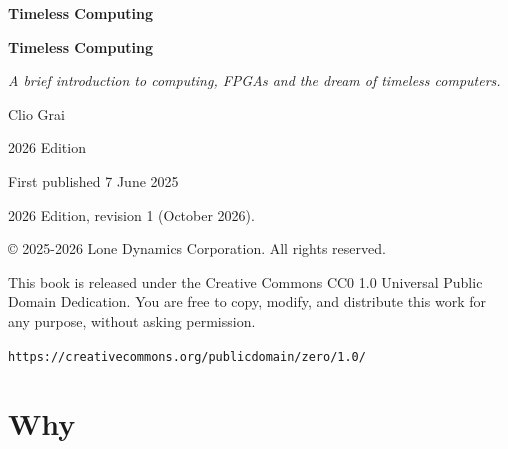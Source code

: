 \documentclass[10pt,twoside,openright]{book}
\author{}
\newcommand{\tccover}{}
\newcommand{\tchalftitle}{%
    \thispagestyle{empty}\null\vspace{0.25\textheight}%
    \begin{center}{\LARGE\bfseries Timeless Computing\par}\end{center}%
    \hypersetup{pageanchor=false}\cleardoublepage\hypersetup{pageanchor=true}}
\newcommand{\tcversobreak}{\newpage\thispagestyle{empty}\null\vfill}
\newcommand{\tcimprint}{}
\newcommand{\tcfront}{\frontmatter}
\newcommand{\tcmain}{\mainmatter}
\newcommand{\tccover}{\hypersetup{pageanchor=false}%
    \hypersetup{pageanchor=true}}
\newcommand{\tchalftitle}{\hypersetup{pageanchor=false}}
\newcommand{\tcversobreak}{}
\newcommand{\tcimprint}{}
\newcommand{\tcfront}{}
\newcommand{\tcmain}{\hypersetup{pageanchor=true}}
\begin{document}
\tccover
\tcfront
\tchalftitle

\begin{titlepage}
    \centering
    \vspace*{0cm}

    {\Huge\bfseries Timeless Computing \par}
    \vspace{1cm}

    {\Large\textit{A brief introduction to computing, FPGAs and the dream of timeless computers.} \par}
    \vspace{2cm}

    {\Large Clio Grai\par}

    \vfill

    {\large 2026 Edition\par}

    {\large First published 7 June 2025\par}
    \vspace{0.6cm}

    \tcversobreak

    {\small
    2026 Edition, revision 1 (October 2026).

    © 2025-2026 Lone Dynamics Corporation. All rights reserved.

    This book is released under the Creative Commons CC0 1.0 Universal Public Domain Dedication. You are free to copy, modify, and distribute this work for any purpose, without asking permission.

   \texttt{https://creativecommons.org/publicdomain/zero/1.0/}
   }

    \tcimprint

\end{titlepage}

\newpage
\tableofcontents
\newpage


\tcmain
\part{Why}

\end{document}
